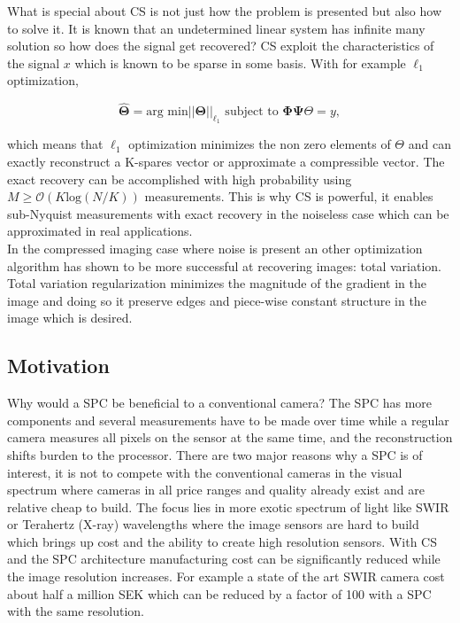 What is special about CS is not just how the problem is presented but also how to solve it. It is known that an undetermined linear system has infinite many solution so how does the signal get recovered? CS exploit the characteristics of the signal $x$ which is known to be sparse in some basis. With for example $\ell_1$ optimization,

\begin{equation}
\label{eq:l1_1}
\widehat{\mathbf{\Theta}} = \text{arg min} ||\mathbf{\Theta} ||_{\ell_1} \text{ subject to } \mathbf{\Phi} \mathbf{\Psi} \Theta = y,
\end{equation}    

which means that $\ell_1$ optimization minimizes the non zero elements of $\Theta$ and can exactly reconstruct a K-spares vector or approximate a compressible vector. The exact recovery can be accomplished with high probability using $M \geq \mathcal{O}(K\text{log}(N/K))$ measurements. This is why CS is powerful, it enables sub-Nyquist measurements with exact recovery in the noiseless case which can be approximated in real applications.\\[0.1in]

In the compressed imaging case where noise is present an other optimization algorithm has shown to be more successful at recovering images: total variation. Total variation regularization minimizes the magnitude of the gradient in the image and doing so it preserve edges and piece-wise constant structure in the image which is desired.     

 
\subsection{Motivation}
Why would a SPC be beneficial to a conventional camera? The SPC has more components and several measurements have to be made over time while a regular camera measures all pixels on the sensor at the same time, and the reconstruction shifts burden to the processor. There are two major reasons why a SPC is of interest, it is not to compete with the conventional cameras in the visual spectrum where cameras in all price ranges and quality already exist and are relative cheap to build. The focus lies in more exotic spectrum of light like SWIR or Terahertz (X-ray) wavelengths where the image sensors are hard to build which brings up cost and the ability to create high resolution sensors. With CS and the SPC architecture manufacturing cost can be significantly reduced while the image resolution increases. For example a state of the art SWIR camera cost about half a million SEK which can be reduced by a factor of 100 with a SPC with the same resolution. 


